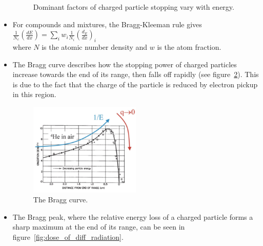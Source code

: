 \begin{itemize}
\begin{figure}[ht]
        \caption{Dominant factors of charged particle stopping vary with energy.}
        \label{fig:stopping_power_dependence}
    \end{figure}
    \item For compounds and mixtures, the Bragg-Kleeman rule gives\\
    $\frac{1}{N_c}\left(\frac{dE}{dx}\right)=\sum_iw_i\frac{1}{N_i}\left(\frac{d_E}{dx}\right)_i$\\
    where $N$ is the atomic number density and $w$ is the atom fraction.
    \item The Bragg curve describes how the stopping power of charged particles increase towards the end of its range, then falls off rapidly (see figure~\ref{fig:bragg_curve}). This is due to the fact that the charge of the particle is reduced by electron pickup in this region.
    \begin{figure}[ht]
        \centering
        \includegraphics[width=0.5\textwidth]{images/bragg_curve.png}
        \caption{The Bragg curve.}
        \label{fig:bragg_curve}
    \end{figure}
    \item The Bragg peak, where the relative energy loss of a charged particle forms a sharp maximum at the end of its range, can be seen in figure~\ref{fig:dose_of_diff_radiation}. 
\end{itemize}

